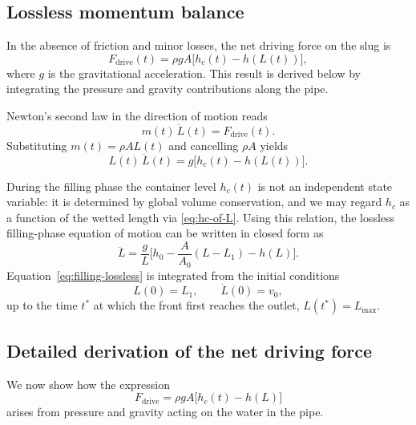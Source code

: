 \documentclass[11pt]{article}
\begin{document}
\subsection{Lossless momentum balance}

In the absence of friction and minor losses, the net driving force on the slug is
\[
  F_{\text{drive}}(t) = \rho g A \bigl[h_c(t) - h(L(t))\bigr],
\]
where $g$ is the gravitational acceleration. This result is derived below by integrating the
pressure and gravity contributions along the pipe.

Newton's second law in the direction of motion reads
\[
  m(t)\,\ddot L(t) = F_{\text{drive}}(t).
\]
Substituting $m(t) = \rho A L(t)$ and cancelling $\rho A$ yields
\[
  L(t)\,\ddot L(t) = g\bigl[h_c(t) - h(L(t))\bigr].
\]

During the filling phase the container level $h_c(t)$ is not an independent state variable:
it is determined by global volume conservation, and we may regard $h_c$ as a function of the wetted length via \eqref{eq:hc-of-L}.
Using this relation, the lossless filling-phase equation of motion can be written in closed form as
\begin{equation}
  \ddot L
  = \frac{g}{L}\Big[h_0 - \frac{A}{A_0}(L - L_1) - h(L)\Big].
  \label{eq:filling-lossless}
\end{equation}
Equation~\eqref{eq:filling-lossless} is integrated from the initial conditions
\[
  L(0) = L_1,\qquad \dot L(0) = v_0,
\]
up to the time $t^*$ at which the front first reaches the outlet, $L(t^*) = L_{\max}$.

\subsection{Detailed derivation of the net driving force}

We now show how the expression
\[
  F_{\text{drive}} = \rho g A \bigl[h_c(t) - h(L)\bigr]
\]
arises from pressure and gravity acting on the water in the pipe.
\end{document}
